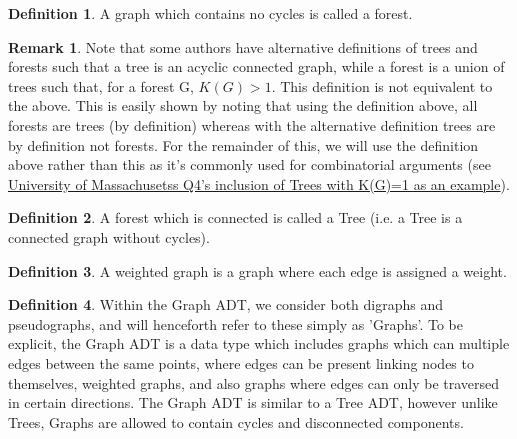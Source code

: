 \documentclass[11pt,reqno]{amsart}
\theoremstyle{definition}
\newtheorem{definition}{Definition}
\newtheorem{remark}[thm]{Remark}
\numberwithin{equation}{section}
\begin{document}
	\begin{definition}
		A graph which contains no cycles is called a forest.
	\end{definition}

\begin{remark}
	Note that some authors have alternative definitions of trees and forests such that a tree is an acyclic connected graph, while a forest is a union of trees such that, for a forest G, $K(G)>1$. This definition is not equivalent to the above. This is easily shown by noting that using the definition above, all forests are trees (by definition) whereas with the alternative definition trees are by definition not forests. For the remainder of this, we will use the definition above rather than this as it's commonly used for combinatorial arguments (see \href{https://people.math.umass.edu/~raymond/math455/ws13-solutions.pdf}{University of Massachusetss Q4's inclusion of Trees with K(G)=1 as an example}).
\end{remark}

\begin{definition}
		A forest which is connected is called a Tree (i.e. a Tree is a connected graph without cycles).
\end{definition}

\begin{definition}
	A weighted graph is a graph where each edge is assigned a weight.
\end{definition}
	
\begin{definition}\label{GADT}
		Within the Graph ADT, we consider both digraphs and pseudographs, and will henceforth refer to these simply as 'Graphs'. To be explicit, the Graph ADT is a data type which includes graphs which can multiple edges between the same points, where edges can be present linking nodes to themselves, weighted graphs, and also graphs where edges can only be traversed in certain directions. The Graph ADT is similar to a Tree ADT, however unlike Trees, Graphs are allowed to contain cycles and disconnected components.
	\end{definition}
	
\end{document}
